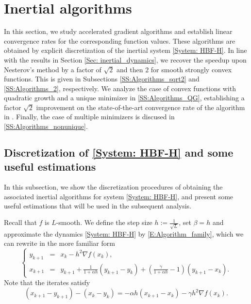 \documentclass[pdflatex,sn-mathphys-num]{sn-jnl}
\theoremstyle{thmstyleone}
\theoremstyle{thmstyletwo}
\theoremstyle{thmstylethree}
\begin{document}
\section{Inertial algorithms}\label{Sec: inertial_algorithms}
In this section, we study accelerated gradient algorithms and establish linear convergence rates for the corresponding function values. These algorithms are obtained by explicit discretization of the inertial system \eqref{System: HBF-H}. In line with the results in Section \ref{Sec: inertial_dynamics}, we recover the speedup upon Nesterov's method by a factor of $\sqrt{2}$ and then $2$ for smooth strongly convex functions. This is given in Subsections \ref{SS:Algorithms_sqrt2} and \ref{SS:Algorithms_2}, respectively. We analyze the case of convex functions with quadratic growth and a unique minimizer in \ref{SS:Algorithms_QG}, establishing a factor $\sqrt{2}$ improvement on the state-of-the-art convergence rate of the algorithm in \cite{Aujol_2023}. Finally, the case of multiple minimizers is discused in \ref{SS:Algorithms_nonunique}.  




\subsection{Discretization of \texorpdfstring{\eqref{System: HBF-H}}{} and some useful estimations}
In this subsection, we show the discretization procedures of obtaining the associated inertial algorithms for system \eqref{System: HBF-H}, and present some useful estimations that will be used in the subsequent analysis.

Recall that $f$ is $L$-smooth. We define the step size $h:=\frac{1}{\sqrt{L}}$, set $\beta=h$ and approximate the dynamics \eqref{System: HBF-H} by \eqref{E:Algorithm_family}, which we can rewrite in the more familiar form
\begin{equation}\label{Algo: AGM}\tag{AGM}
\left\{
\begin{array}{rcl}
y_{k+1} & = & x_k - h^2 \nabla f(x_k),\\[2pt]
x_{k+1} & = & y_{k+1} + \frac{1}{1 + \alpha h}( y_{k+1} - y_k ) + \left( \frac{\gamma}{1+\alpha h} - 1 \right) ( y_{k+1} - x_k ).
\end{array}
\right.
\end{equation}
Note that the iterates satisfy
\begin{equation}\label{E: iterates}
(x_{k+1}-y_{k+1}) - (x_k-y_k) = -\alpha h(x_{k+1}-x_k) - \gamma h^2 \nabla f(x_k).
\end{equation}
\end{document}
